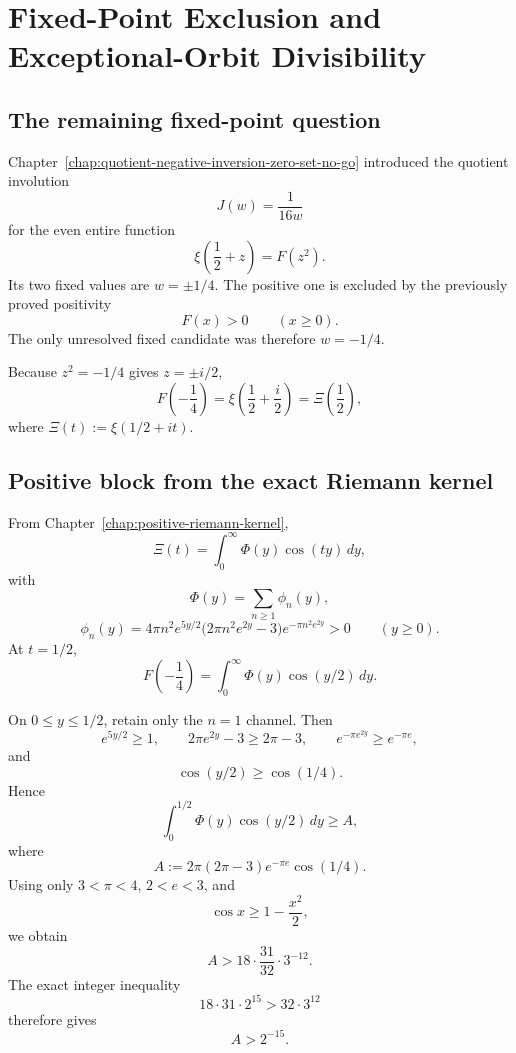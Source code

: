 \chapter{Fixed-Point Exclusion and Exceptional-Orbit Divisibility}
\label{chap:g017-fixed-point-exclusion}


\section{The remaining fixed-point question}

Chapter~\ref{chap:quotient-negative-inversion-zero-set-no-go} introduced the quotient involution
\[
 J(w)=\frac{1}{16w}
\]
for the even entire function
\[
 \xi\!\left(\frac12+z\right)=F(z^2).
\]
Its two fixed values are $w=\pm1/4$.  The positive one is excluded by the previously proved positivity
\[
 F(x)>0\qquad(x\ge0).
\]
The only unresolved fixed candidate was therefore $w=-1/4$.

Because $z^2=-1/4$ gives $z=\pm i/2$,
\[
 F\!\left(-\frac14\right)
 =\xi\!\left(\frac12+\frac{i}{2}\right)
 =\Xi\!\left(\frac12\right),
\]
where $\Xi(t):=\xi(1/2+it)$.

\section{Positive block from the exact Riemann kernel}

From Chapter~\ref{chap:positive-riemann-kernel},
\[
 \Xi(t)=\int_0^\infty \Phi(y)\cos(ty)\,dy,
\]
with
\[
 \Phi(y)=\sum_{n\ge1}\phi_n(y),
\]
\[
 \phi_n(y)=4\pi n^2e^{5y/2}
 \bigl(2\pi n^2e^{2y}-3\bigr)e^{-\pi n^2e^{2y}}>0
 \qquad(y\ge0).
\]
At $t=1/2$,
\[
 F\!\left(-\frac14\right)
 =\int_0^\infty\Phi(y)\cos(y/2)\,dy.
\]

On $0\le y\le1/2$, retain only the $n=1$ channel.  Then
\[
 e^{5y/2}\ge1,
 \qquad
 2\pi e^{2y}-3\ge2\pi-3,
 \qquad
 e^{-\pi e^{2y}}\ge e^{-\pi e},
\]
and
\[
 \cos(y/2)\ge\cos(1/4).
\]
Hence
\[
 \int_0^{1/2}\Phi(y)\cos(y/2)\,dy\ge A,
\]
where
\[
 A:=2\pi(2\pi-3)e^{-\pi e}\cos(1/4).
\]
Using only $3<\pi<4$, $2<e<3$, and
\[
 \cos x\ge1-\frac{x^2}{2},
\]
we obtain
\[
 A>18\cdot\frac{31}{32}\cdot3^{-12}.
\]
The exact integer inequality
\[
 18\cdot31\cdot2^{15}>32\cdot3^{12}
\]
therefore gives
\begin{equation}
 \boxed{A>2^{-15}}.
 \label{eq:g017-positive-block}
\end{equation}

